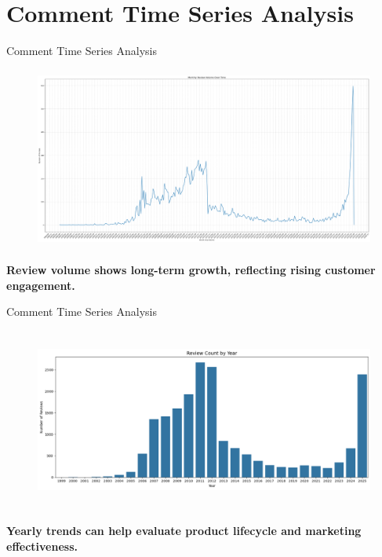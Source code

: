 \section{Comment Time Series Analysis}


\begin{frame}{Comment Time Series Analysis}
	
	\vspace{-5pt}
	\begin{figure}
		\centering
			\includegraphics[height=6cm]{pic/ts_1.png}
	\end{figure}

    \vspace{-5pt}
    \begin{center}
        \textbf{Review volume shows long-term growth, reflecting rising customer engagement.}
    \end{center}

\end{frame}

\begin{frame}{Comment Time Series Analysis}
	
	\vspace{-5pt}
	\begin{figure}
		\centering
			\includegraphics[height=6cm]{pic/ts_2.png}
	\end{figure}

    \vspace{-5pt}
    \begin{center}
        \textbf{Yearly trends can help evaluate product lifecycle and marketing effectiveness.}
    \end{center}

\end{frame}

